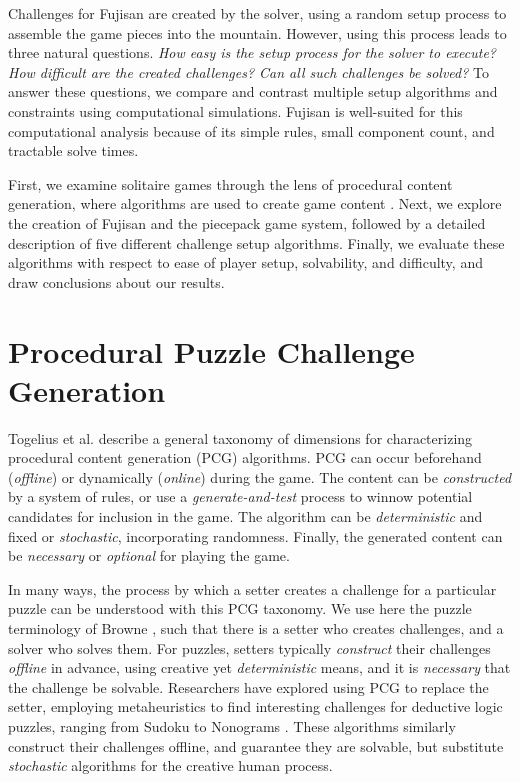 \documentclass[10pt,journal,compsoc]{IEEEtran}
\begin{document}
Challenges for Fujisan are created by the solver, using a random setup process to assemble the game pieces into the mountain. However, using this process leads to three natural questions. {\it How easy is the setup process for the solver to execute? How difficult are the created challenges? Can all such challenges be solved? }
To answer these questions, we compare and contrast multiple setup algorithms and constraints using computational simulations. Fujisan is well-suited for this computational analysis because of its simple rules, small component count, and tractable solve times. 

First, we examine solitaire games through the lens of procedural content generation, where algorithms are used to create game content \cite{PCGSURVEY}. Next, we explore the creation of Fujisan and the piecepack game system, followed by a detailed description of five different challenge setup algorithms. Finally, we evaluate these algorithms with respect to ease of player setup, solvability, and difficulty, and draw conclusions about our results. 


\section{Procedural Puzzle Challenge Generation}  \label{sec:Background}

\noindent
Togelius et al. \cite{SBPCG} describe a general taxonomy of dimensions for characterizing procedural content generation (PCG) algorithms. PCG can occur beforehand ({\it offline}) or dynamically ({\it online}) during the game. The content can be {\it constructed}
by a system of rules, or use a {\it generate-and-test} process to winnow potential candidates for inclusion in the game.
The algorithm can be {\it deterministic} and fixed or {\it stochastic}, incorporating randomness.
Finally, the generated content can be {\it necessary} or {\it optional} for playing the game.

In many ways, the process by which a setter creates a challenge for a particular puzzle can be understood with this PCG taxonomy. We use here the puzzle terminology of Browne \cite{PUZZLENATURE}, such that there is a setter who creates challenges, and a solver who solves them.
For puzzles, setters typically {\it construct} their challenges {\it offline} in advance, using creative yet {\it deterministic} means, and it is {\it necessary} that the challenge be solvable. Researchers have explored using PCG to replace the setter, employing metaheuristics to find interesting challenges for deductive logic puzzles, ranging from Sudoku \cite{SUDOKU} to Nonograms \cite{NONOGRAM}. These algorithms similarly construct their challenges offline, and guarantee they are solvable, but substitute {\it stochastic} algorithms for the creative human process.
\end{document}
